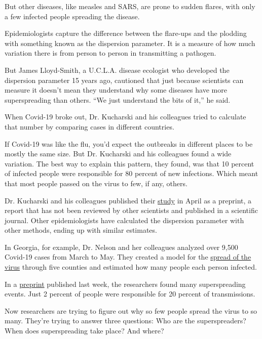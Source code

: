But other diseases, like measles and SARS, are prone to sudden flares,
with only a few infected people spreading the disease.

Epidemiologists capture the difference between the flare-ups and the
plodding with something known as the dispersion parameter. It is a
measure of how much variation there is from person to person in
transmitting a pathogen.

But James Lloyd-Smith, a U.C.L.A. disease ecologist who developed the
dispersion parameter 15 years ago, cautioned that just because
scientists can measure it doesn't mean they understand why some diseases
have more superspreading than others. ``We just understand the bits of
it,'' he said.

When Covid-19 broke out, Dr. Kucharski and his colleagues tried to
calculate that number by comparing cases in different countries.

If Covid-19 was like the flu, you'd expect the outbreaks in different
places to be mostly the same size. But Dr. Kucharski and his colleagues
found a wide variation. The best way to explain this pattern, they
found, was that 10 percent of infected people were responsible for 80
percent of new infections. Which meant that most people passed on the
virus to few, if any, others.

Dr. Kucharski and his colleagues published their
\href{https://wellcomeopenresearch.org/articles/5-67}{study} in April as
a preprint, a report that has not been reviewed by other scientists and
published in a scientific journal. Other epidemiologists have calculated
the dispersion parameter with other methods, ending up with similar
estimates.

In Georgia, for example, Dr. Nelson and her colleagues analyzed over
9,500 Covid-19 cases from March to May. They created a model for the
\href{https://www.nytimes.com/2020/07/21/health/coronavirus-infections-us.html}{spread
of the virus} through five counties and estimated how many people each
person infected.

In a
\href{https://www.medrxiv.org/content/10.1101/2020.06.20.20130476v2}{preprint}
published last week, the researchers found many superspreading events.
Just 2 percent of people were responsible for 20 percent of
transmissions.

Now researchers are trying to figure out why so few people spread the
virus to so many. They're trying to answer three questions: Who are the
superspreaders? When does superspreading take place? And where?

